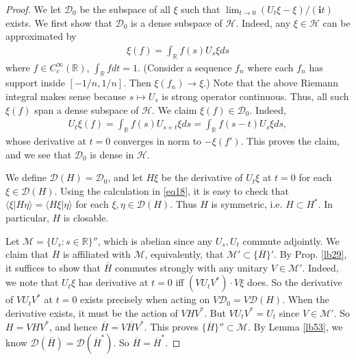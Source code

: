 \documentclass[12pt,b5paper,notitlepage]{article}
\theoremstyle{definition}
\theoremstyle{plain}
\newcommand{\mc}{\mathcal}
\newcommand{\ovl}{\overline}
\newcommand{\Dom}{\scr D}
\newcommand{\bk}[1]{\langle {#1}\rangle}
\newcommand{\scr}{\mathscr}
\newcommand{\im}{\mathbf{i}}
\newcommand{\Rbb}{\mathbb R}
\numberwithin{equation}{section}
\begin{document}
\begin{proof}
We let $\Dom_0$ be the subspace of all $\xi$ such that $\lim_{t\rightarrow 0}(U_t\xi-\xi)/(\im t)$ exists. We first show that $\Dom_0$ is a dense subspace of $\mc H$. Indeed, any $\xi\in\mc H$ can be approximated by
\begin{align*}
\xi(f)=\int_\Rbb f(s)U_s\xi ds	
\end{align*}
where $f\in C_c^\infty(\Rbb)$,  $\int_\Rbb fdt=1$. (Consider a sequence $f_n$ where each $f_n$ has support inside $[-1/n,1/n]$. Then $\xi(f_n)\rightarrow\xi$.) Note that the above Riemann integral makes sense because $s\mapsto U_s$ is strong operator continuous. Thus, all such $\xi(f)$ span a dense subspace of $\mc H$. We claim $\xi(f)\in\Dom_0$. Indeed,
\begin{align*}
U_t\xi(f)=\int_\Rbb f(s)U_{s+t}\xi ds=\int_\Rbb f(s-t)U_s\xi ds,	
\end{align*}
whose derivative at $t=0$ converges in norm to $-\xi(f')$. This proves the claim, and we see that $\Dom_0$ is dense in $\mc H$.

We define $\Dom(H)=\Dom_0$, and let $H\xi$ be the derivative of $U_t\xi$ at $t=0$ for each $\xi\in\Dom(H)$. Using the calculation in \eqref{eq18}, it is easy to check that $\bk{\xi|H\eta}=\bk{H\xi|\eta}$ for each $\xi,\eta\in\Dom(H)$. Thus $H$ is symmetric, i.e. $H\subset H^*$. In particular, $H$ is closable. 

Let $\mc M=\{U_s:s\in\Rbb\}''$, which is abelian since any $U_s,U_t$ commute adjointly. We claim that $\ovl H$ is affiliated with $\mc M$, equivalently, that $\mc M'\subset\{\ovl H\}'$. By Prop. \ref{lb29}, it suffices to show that $\ovl H$ commutes strongly with any unitary $V\in\mc M'$. Indeed, we note that $U_t\xi$ has derivative at $t=0$ iff $(VU_tV^*)\cdot V\xi$ does. So the derivative of $VU_tV^*$ at $t=0$ exists precisely when acting on $V\Dom_0=V\Dom(H)$. When the derivative exists, it must be the action of $VHV^*$. But $VU_tV^*=U_t$ since $V\in\mc M'$. So $H=VHV^*$, and hence $\ovl H=V\ovl HV^*$. This proves $\{\ovl H\}''\subset\mc M$. By Lemma \ref{lb53}, we know $\Dom(\ovl H)=\Dom(\ovl H^*)$. So $\ovl H=\ovl H^*$.


\end{proof}
\end{document}
